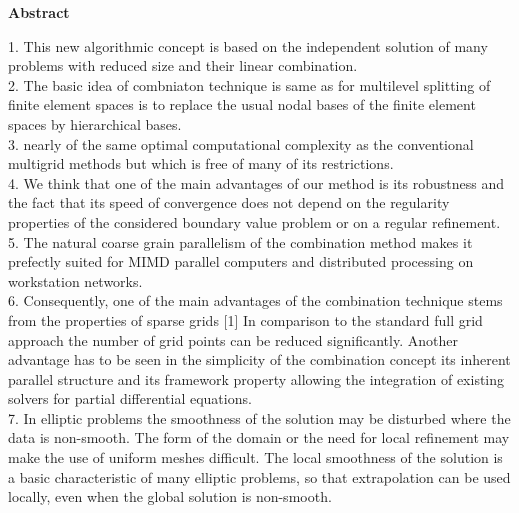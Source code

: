 

\clearemptydoublepage
{}
{}	


\vspace*{2cm}
\begin{center}
{\Large \bf Abstract}
\end{center}
\vspace{1cm}

1. This new algorithmic concept is based on the independent solution of many problems with reduced size and their linear combination. \cite{Griebel1992}\\
2. The basic idea of combniaton technique is same as for multilevel splitting of finite element spaces is to replace the usual nodal bases of the finite element spaces by hierarchical bases.\cite{Yserentant1986} \\
3. nearly of the same optimal computational complexity as the conventional multigrid methods but which is free of many of its restrictions. \cite{Yserentant1986} \\
4. We think that one of the main advantages of our method is its robustness and the fact that its speed of convergence does not depend on the regularity properties of the considered boundary value problem or on a regular refinement.\cite{Yserentant1986} \\
5. The natural coarse grain parallelism of the combination method makes it prefectly suited for MIMD parallel computers and distributed processing on workstation networks.\cite{Griebel1992} \\

6. Consequently, one of the main advantages of the combination technique stems from the properties of sparse grids [1] In comparison to the standard full grid approach the number of grid points can be reduced significantly. Another advantage has to be seen in the simplicity of the combination concept its inherent parallel structure and its framework property allowing the integration of existing solvers for partial differential equations.\cite{Bungartz1994}\\

7. In elliptic problems the smoothness of the solution may be disturbed where the data is non-smooth. The form of the domain or the need for local refinement may make the use of uniform meshes difficult.  The local smoothness of the solution is a basic characteristic of many elliptic problems, so that extrapolation can be used locally, even when the global solution is non-smooth.\cite{Rude1994} \\

